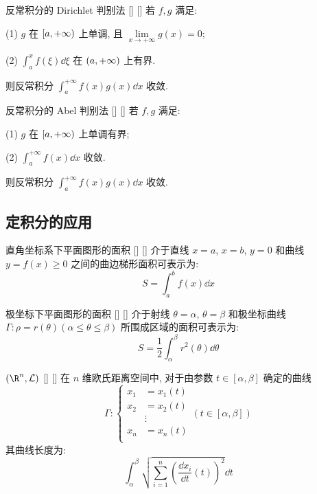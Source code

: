 \documentclass[UTF8]{ctexart}
\begin{document}
			\begin{thm}
			    []
			    {反常积分的 Dirichlet 判别法}
			    []
			    []
				若 \(f,g\) 满足: 

				(1)	\(g\) 在 \(\Ico{a}{+\infty}\) 上单调, 且 \(\lim\limits_{x\to+\infty}g(x)=0\); 

				(2) \(\int_a^x f(\xi)\dd\xi\) 在 \(\Ioo{a}{+\infty}\) 上有界. 

				则反常积分 \(\int_a^{+\infty}f(x)g(x)\dd x\) 收敛. 
			\end{thm}
			
			\begin{thm}
			    []
			    {反常积分的 Abel 判别法}
			    []
			    []
				若 \(f,g\) 满足: 

				(1) \(g\) 在 \(\Ico{a}{+\infty}\) 上单调有界; 

				(2) \(\int_a^{+\infty}f(x)\dd x\) 收敛. 

				则反常积分 \(\int_a^{+\infty}f(x)g(x)\dd x\) 收敛. 
			\end{thm}

		\subsection{定积分的应用}
				
			\begin{thm}
			    []
			    {直角坐标系下平面图形的面积}
			    []
			    []
				介于直线 \(x=a\), \(x=b\), \(y=0\) 和曲线 \(y=f(x)\geq 0\) 之间的曲边梯形面积可表示为: 
				\[S=\int_a^b f(x)\dd x\]
			\end{thm}

			\begin{crl}
			    []
			    {极坐标下平面图形的面积}
			    []
			    []
				介于射线 \(\theta=\alpha\), \(\theta=\beta\) 和极坐标曲线 \(\varGamma: \rho=r(\theta)(\alpha\leq\theta\leq\beta)\) 所围成区域的面积可表示为: 
				\[S=\frac{1}{2}\int_\alpha^\beta r^2(\theta)\dd\theta\]
			\end{crl}

			\begin{thm}
			    []
			    { \((\R^n,\mathcal{L})\) }
			    []
			    []
				在 \(n\) 维欧氏距离空间中, 对于由参数 \(t\in[\alpha,\beta]\) 确定的曲线
				\[\varGamma:
				\begin{cases}
					x_1 & = x_1(t)\\
					x_2 & = x_2(t)\\
					& \vdots\\
					x_n & = x_n(t)\\
				\end{cases}
				(t\in[\alpha,\beta])\]
				其曲线长度为: 
				\[\int_\alpha^\beta\sqrt{\sum_{i=1}^{n}{\left(\frac{\dd x_i}{\dd t}(t)\right)}^2}\dd t\]
			\end{thm}
\end{document}
